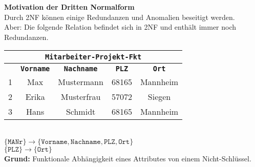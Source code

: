 \begin{frame}[t]\frametitle{\insertsection}
\framesubtitle{\insertsubsection}
\textbf{Motivation der Dritten Normalform}
\\[4pt]
Durch 2NF k\"onnen einige Redundanzen und Anomalien beseitigt werden. 
\pause
\\[4pt]
\alert{Aber: Die folgende Relation befindet sich in 2NF und enth\"alt immer noch Redundanzen.}
\begin{center}
	\begin{tabular}{|c|c|c|c|c|}\hline
		\multicolumn{5}{|c|}{\small \textbf{\texttt{Mitarbeiter-Projekt-Fkt}}}\\\hline\hline
		\small \textbf{\key{\texttt{MANr}}} & \small \textbf{\texttt{Vorname}}&\small \textbf{\texttt{Nachname}}
		  &\small\textbf{\texttt{PLZ}} &\small \textbf{\texttt{Ort}} \\\hline 
		\small 1 &\small Max & \small Mustermann &\small 68165 &\cellcolor{Red}\small Mannheim \\\hline 
		\small 2 &\small Erika &\small Musterfrau &\small 57072 &\small Siegen \\\hline 
		\small 3 &\small Hans &\small Schmidt &\small 68165 &\cellcolor{Red}\small Mannheim \\\hline 
	\end{tabular}
\end{center}
\hspace*{9em}{Funktionale Abh\"angigkeiten:}\\
\hspace*{9em}$\{\texttt{MANr}\}\rightarrow\{\texttt{Vorname},\texttt{Nachname},\texttt{PLZ},\texttt{Ort}\}$
\\
\hspace*{9em}$\{\texttt{PLZ}\}\rightarrow\{\texttt{Ort}\}$
\pause
\\[4pt]
\textbf{Grund:} Funktionale Abh\"angigkeit eines Attributes von einem Nicht-Schl\"ussel.
\end{frame}


